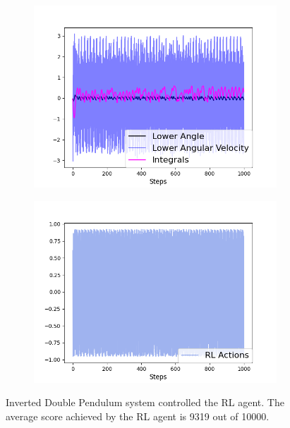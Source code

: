 \begin{figure}[H]
\centering
\begin{subfigure}{0.4\textwidth}
\centering
\includegraphics[width=\linewidth]{double_RL.png}
\end{subfigure}%
\begin{subfigure}{.4\textwidth}
\centering
\includegraphics[width=\linewidth]{double_RL_actions.png}
\end{subfigure}
\caption{Inverted Double Pendulum system controlled the RL agent. The average score achieved by the RL agent is 9319 out of 10000.}
\label{fig:double_rl}
\end{figure}


